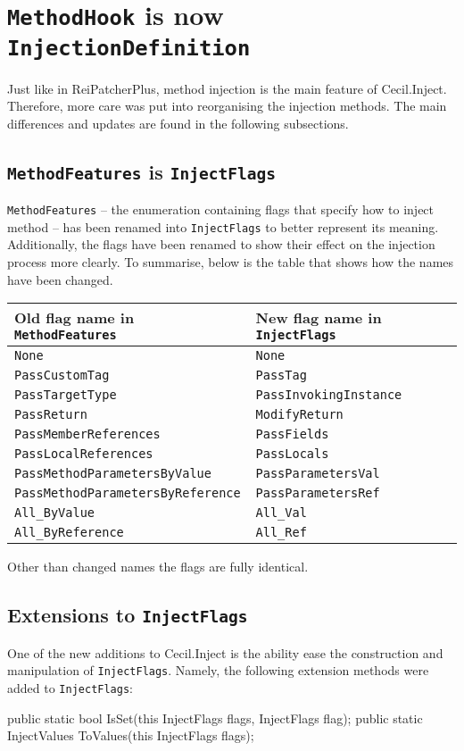 \documentclass[a4paper,11pt]{article}
\newcommand{\CecilInject}{\textsc{C}{\scriptsize \sc ecil}.\textsc{I}{\scriptsize \sc nject}}
\begin{document}
\section{\texttt{MethodHook} is now \texttt{InjectionDefinition}}
Just like in ReiPatcherPlus, method injection is the main feature of \CecilInject{}. Therefore, more care was put into reorganising the injection methods. The main differences and updates are found in the following subsections.

\subsection{\texttt{MethodFeatures} is \texttt{InjectFlags}}
\texttt{MethodFeatures} -- the enumeration containing flags that specify how to inject method -- has been renamed into \texttt{InjectFlags} to better represent its meaning. Additionally, the flags have been renamed to show their effect on the injection process more clearly. To summarise, below is the table that shows how the names have been changed.
\begin{center}
\begin{tabular}{|l|l|}
\hline
Old flag name in \texttt{MethodFeatures} & New flag name in \texttt{InjectFlags} \\ \hline
\texttt{None} & \texttt{None} \\ \hline
\texttt{PassCustomTag} & \texttt{PassTag} \\ \hline
\texttt{PassTargetType} & \texttt{PassInvokingInstance} \\ \hline
\texttt{PassReturn} & \texttt{ModifyReturn} \\ \hline
\texttt{PassMemberReferences} & \texttt{PassFields} \\ \hline
\texttt{PassLocalReferences} & \texttt{PassLocals} \\ \hline
\texttt{PassMethodParametersByValue} & \texttt{PassParametersVal} \\ \hline
\texttt{PassMethodParametersByReference} & \texttt{PassParametersRef} \\ \hline
\texttt{All\_ByValue} & \texttt{All\_Val} \\ \hline
\texttt{All\_ByReference} & \texttt{All\_Ref} \\ \hline
\end{tabular}
\end{center}
Other than changed names the flags are fully identical.

\subsection{Extensions to \texttt{InjectFlags}}
One of the new additions to \CecilInject{} is the ability ease the construction and manipulation of \texttt{InjectFlags}. Namely, the following extension methods were added to \texttt{InjectFlags}:
\begin{cs}
public static bool IsSet(this InjectFlags flags, InjectFlags flag);
public static InjectValues ToValues(this InjectFlags flags);
\end{cs}
\end{document}

